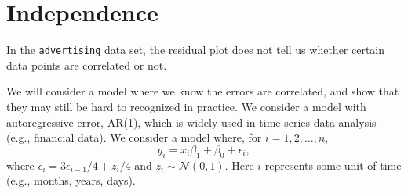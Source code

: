 \documentclass[12pt,]{book}
\newenvironment{Shaded}{\begin{snugshade}}{\end{snugshade}}
\newcommand{\KeywordTok}[1]{\textcolor[rgb]{0.13,0.29,0.53}{\textbf{#1}}}
\newcommand{\DataTypeTok}[1]{\textcolor[rgb]{0.13,0.29,0.53}{#1}}
\newcommand{\DecValTok}[1]{\textcolor[rgb]{0.00,0.00,0.81}{#1}}
\newcommand{\StringTok}[1]{\textcolor[rgb]{0.31,0.60,0.02}{#1}}
\newcommand{\OperatorTok}[1]{\textcolor[rgb]{0.81,0.36,0.00}{\textbf{#1}}}
\newcommand{\NormalTok}[1]{#1}
\begin{document}
\section{Independence}\label{independence}

In the \texttt{advertising} data set, the residual plot does not tell us
whether certain data points are correlated or not.

\begin{Shaded}
\end{Shaded}

We will consider a model where we know the errors are correlated, and
show that they may still be hard to recognized in practice. We consider
a model with autoregressive error, AR(1), which is widely used in
time-series data analysis (e.g., financial data). We consider a model
where, for \(i=1,2,\ldots, n\),
\[ y_i = x_i \beta_1 + \beta_0 + \epsilon_i,\] where
\(\epsilon_i = 3\epsilon_{i-1}/4 + z_i/4\) and
\(z_i\sim \mathcal{N}(0,1)\). Here \(i\) represents some unit of time
(e.g., months, years, days).
\end{document}
